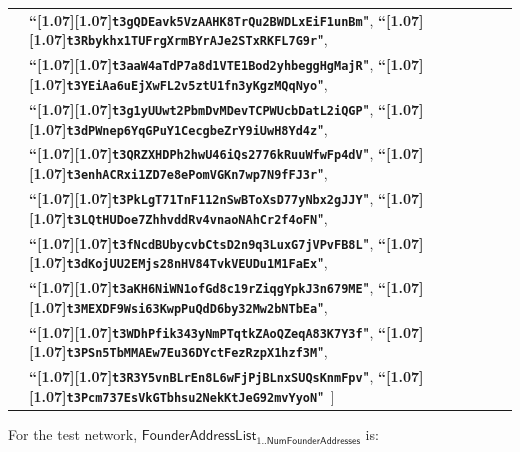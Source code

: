 \documentclass{article}
\let\oldtexttt\texttt
\renewcommand{\texttt}[1]{\scalebox{1.02}[1.07]{\oldtexttt{#1}}}
\newcommand{\introlist}{\needspace{15ex}}
\newcommand{\ascii}[1]{\textbf{``\texttt{#1}"}}
\newcommand{\NumFounderAddresses}{\mathsf{NumFounderAddresses}}
\newcommand{\FounderAddressList}{\mathsf{FounderAddressList}}
\begin{document}
\begin{tabular}{@{\hskip 2.5em}l@{\;}l}
 & \ascii{t3gQDEavk5VzAAHK8TrQu2BWDLxEiF1unBm}, \ascii{t3Rbykhx1TUFrgXrmBYrAJe2STxRKFL7G9r}, \\
 & \ascii{t3aaW4aTdP7a8d1VTE1Bod2yhbeggHgMajR}, \ascii{t3YEiAa6uEjXwFL2v5ztU1fn3yKgzMQqNyo}, \\
 & \ascii{t3g1yUUwt2PbmDvMDevTCPWUcbDatL2iQGP}, \ascii{t3dPWnep6YqGPuY1CecgbeZrY9iUwH8Yd4z}, \\
 & \ascii{t3QRZXHDPh2hwU46iQs2776kRuuWfwFp4dV}, \ascii{t3enhACRxi1ZD7e8ePomVGKn7wp7N9fFJ3r}, \\
 & \ascii{t3PkLgT71TnF112nSwBToXsD77yNbx2gJJY}, \ascii{t3LQtHUDoe7ZhhvddRv4vnaoNAhCr2f4oFN}, \\
 & \ascii{t3fNcdBUbycvbCtsD2n9q3LuxG7jVPvFB8L}, \ascii{t3dKojUU2EMjs28nHV84TvkVEUDu1M1FaEx}, \\
 & \ascii{t3aKH6NiWN1ofGd8c19rZiqgYpkJ3n679ME}, \ascii{t3MEXDF9Wsi63KwpPuQdD6by32Mw2bNTbEa}, \\
 & \ascii{t3WDhPfik343yNmPTqtkZAoQZeqA83K7Y3f}, \ascii{t3PSn5TbMMAEw7Eu36DYctFezRzpX1hzf3M}, \\
 & \ascii{t3R3Y5vnBLrEn8L6wFjPjBLnxSUQsKnmFpv}, \ascii{t3Pcm737EsVkGTbhsu2NekKtJeG92mvYyoN}\, ]
\end{tabular}

\introlist
For the test network, $\FounderAddressList_{\mathrm{1}..\NumFounderAddresses}$ is:
\end{document}
